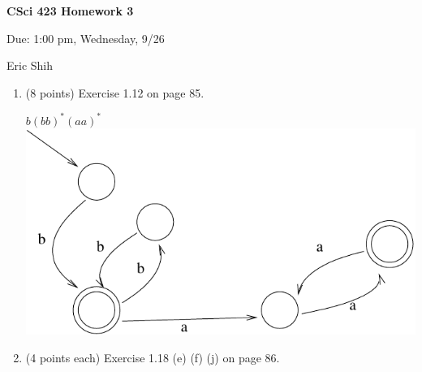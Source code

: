 \documentclass[11pt]{article}
\begin{document}
\begin{LARGE}
\centerline {\bf CSci 423 Homework 3}
\end{LARGE}
\vskip 0.25cm

\centerline{Due: 1:00 pm, Wednesday, 9/26}
\centerline{Eric Shih}

\begin{enumerate}
 \item (8 points) Exercise 1.12 on page 85.
  \begin{center}
    $b(bb)^*(aa)^*$ \\
    \includegraphics[scale=.4] {fig1.pdf}
  \end{center}

 \item (4 points each) Exercise 1.18 (e) (f) (j) on page 86.


\end{enumerate}
\end{document}
